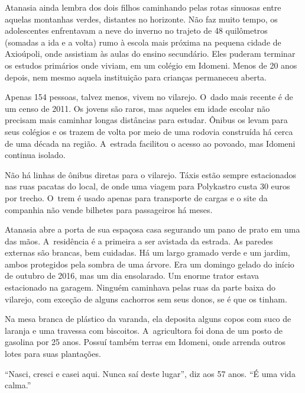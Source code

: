 \clearpage

 

Atanasia ainda lembra dos dois filhos caminhando pelas rotas sinuosas
entre aquelas montanhas verdes, distantes no horizonte. Não faz muito
tempo, os adolescentes enfrentavam a neve do inverno no trajeto de
48 quilômetros (somadas a ida e a volta) rumo à escola mais próxima na
pequena cidade de Axioúpoli, onde assistiam às aulas do ensino
secundário. Eles puderam terminar os estudos primários onde viviam, em
um colégio em Idomeni. Menos de 20 anos depois, nem mesmo aquela
instituição para crianças permaneceu aberta.

Apenas 154 pessoas, talvez menos, vivem no vilarejo. O~dado mais recente
é de um censo de 2011. Os jovens são raros, mas aqueles em idade escolar
não precisam mais caminhar longas distâncias para estudar. Ônibus os
levam para seus colégios e os trazem de volta por meio de uma rodovia
construída há cerca de uma década na região. A~estrada facilitou o
acesso ao povoado, mas Idomeni continua isolado.

Não há linhas de ônibus diretas para o vilarejo. Táxis estão sempre
estacionados nas ruas pacatas do local, de onde uma viagem para
Polykastro custa 30 euros por trecho. O~trem é usado apenas para
transporte de cargas e o site da companhia não vende bilhetes para
passageiros há meses.

Atanasia abre a porta de sua espaçosa casa segurando um pano de prato em
uma das mãos. A~residência é a primeira a ser avistada da estrada. As
paredes externas são brancas, bem cuidadas. Há um largo gramado verde e
um jardim, ambos protegidos pela sombra de uma árvore. Era um domingo
gelado do início de outubro de 2016, mas um dia ensolarado. Um enorme
trator estava estacionado na garagem. Ninguém caminhava pelas ruas da
parte baixa do vilarejo, com exceção de alguns cachorros sem seus
donos, se é que os tinham.

Na mesa branca de plástico da varanda, ela deposita alguns copos com
suco de laranja e uma travessa com biscoitos. A~agricultora foi dona de
um posto de gasolina por 25 anos. Possuí também terras em Idomeni, onde
arrenda outros lotes para suas plantações.

``Nasci, cresci e casei aqui. Nunca saí deste lugar'', diz aos 57 anos.
``É uma vida calma.''

